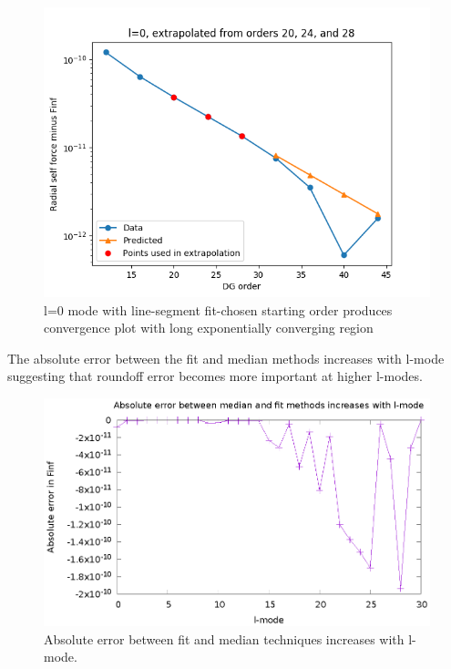 \begin{figure}
  \includegraphics{fittingtechniqet370l0}
  \caption{l=0 mode with line-segment fit-chosen starting order produces convergence plot with long exponentially converging region}
  \label{autoconverge}
\end{figure}

The absolute error between the fit and median methods increases with l-mode suggesting that roundoff error becomes more important at higher l-modes.

\begin{figure}
  \includegraphics{absErrorIncreaseslmode}
  \caption{Absolute error between fit and median techniques increases with l-mode.}
  \label{abserrfitmedian}
\end{figure}

